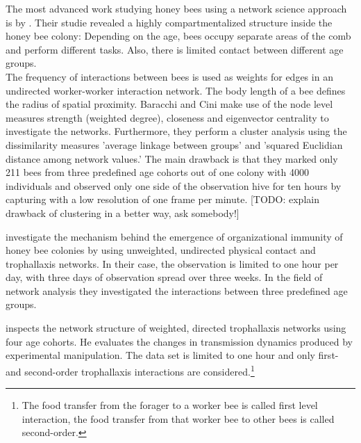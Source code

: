 The most advanced work studying honey bees using a network science approach is by \textcite{baracchi2014socio}.
Their studie revealed a highly compartmentalized structure inside the honey bee colony:
Depending on the age, bees occupy separate areas of the comb and perform different tasks. Also, there is limited contact between different age groups.\\
The frequency of interactions between bees is used as weights for edges in an undirected worker-worker interaction network. The body length of a bee defines the radius of spatial proximity.
Baracchi and Cini make use of the node level measures strength (weighted degree), closeness and eigenvector centrality to investigate the networks.
Furthermore, they perform a cluster analysis using the dissimilarity measures ’average linkage between groups' and ’squared Euclidian distance among network values.'
The main drawback is that they marked only 211 bees from three predefined age cohorts out of one colony with 4000 individuals and observed only one side of the observation hive for ten hours by capturing with a low resolution of one frame per minute. [TODO: explain drawback of clustering in a better way, ask somebody!]


\textcite{scholl2011olfactory} investigate the mechanism behind the emergence of organizational immunity of honey bee colonies by using unweighted, undirected physical contact and trophallaxis networks.
In their case, the observation is limited to one hour per day, with three days of observation spread over three weeks.
In the field of network analysis they investigated the interactions between three predefined age groups.


\textcite{naug2008structure} inspects the network structure of weighted, directed trophallaxis networks using four age cohorts. He evaluates the changes in transmission dynamics produced by experimental manipulation.
The data set is limited to one hour and only first- and second-order trophallaxis interactions are considered.\footnote{The food transfer from the forager to a worker bee is called first level interaction, the food transfer from that worker bee to other bees is called second-order.}



